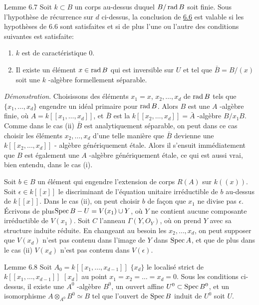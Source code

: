 \documentclass[10pt]{../fichiers-configuration-latex/smfart}
\begin{document}
\begin{enonce*}{Lemme 6.7}
Soit $k\subset B$ un corps au-dessus duquel $B/\operatorname{rad} B$ soit
finie. Sous l'hypothèse de récurrence sur $d$ ci-dessus, la conclusion
de \hyperref[XIX.lem6.6]{6.6} est valable si les hypothèses de $6.6$ sont satisfaites et si
de plus l'une ou l'autre des conditions suivantes est satisfaite:
\begin{enumerate}
\renewcommand{\theenumi}{\roman{enumi}}
\renewcommand{\labelenumi}{(\theenumi)}
\item $k$ est de caractéristique $0$.

\item Il existe un élément $x\in \operatorname{rad} B$ qui est inversible sur $U$ et
tel que $\bar{B}=B/(x)$ soit une $k$ -algèbre formellement séparable.
\end{enumerate}
\end{enonce*}

\medskip
\noindent
\emph{Démonstration}. Choisissons des éléments $x_{1}=x$,
$x_{2},\ldots, x_{d}$ de $\operatorname{rad} B$ tels que $\{x_{1},\ldots,x_{d}\}$
engendre un idéal primaire pour $\operatorname{rad} B$. Alors $B$ est une $A$
-algèbre finie, où $A=k[[x_{1},\ldots,x_{d}]]$, et $\bar{B}$ est la
$k[[x_{2},\ldots, x_{d}]]=\bar{A}$ -algèbre $B/x_{1}B$. Comme dans le
cas (ii) $\bar{B}$ est analytiquement séparable, on peut dans ce cas
choisir les éléments $x_{2},\ldots,x_{d}$ d'une telle manière que
$\bar{B}$ devienne une $k[[x_{2},\ldots,x_{d}]]$ - algèbre
génériquement étale. Alors il s'ensuit immédiatement que $B$ est
également une $A$ -algèbre génériquement étale, ce qui est aussi vrai,
bien entendu, dans le cas (i).

Soit $b\in B$ un élément qui engendre l'extension de corps $R(A)$ sur
$k((x))$. Soit $\epsilon \in k[[x]]$ le discriminant de l'équation
unitaire irréductible de $b$ au-dessus de $k[[x]]$. Dans le cas (ii),
on peut choisir $b$ de façon que $x_{1}$ ne divise pas
$\epsilon$. Écrivons de plus\pageoriginale $\operatorname{Spec} B-U=V(x_{1})\cup Y$,
où $Y$ ne contient aucune composante irréductible de $V(x_{1})$. Soit
$C$ l'anneau $\Gamma(Y,O_{Y})$, où on prend $Y$ avec sa structure
induite réduite. En changeant au besoin les $x_{2},\ldots,x_{d}$, on
peut supposer que $V(x_{d})$ n'est pas contenu dans l'image de $Y$
dans $\operatorname{Spec} A$, et que de plus dans le cas (ii) $V(x_{d})$ n'est pas
contenu dans $V(\epsilon)$.

\begin{enonce*}{Lemme 6.8}
Soit $A_{0}=k[[x_{1},\ldots,x_{d-1}]]$ $\{x_{d}\}$ le localisé strict
de $k[[x_{1},\ldots,x_{d-1}]]$ $[x_{d}]$ au point
$x_{1}=x_{2}=\ldots=x_{d}=0$. Sous les conditions ci-dessus, il existe
une $A^{0}$ -algèbre $B^{0}$, un ouvert affine $U^{0}\subset \operatorname{Spec}
B^{0}$, et un isomorphisme $A\otimes_{A^{0}}B^{0}\simeq B$ tel que
l'ouvert de $\operatorname{Spec} B$ induit de $U^{0}$ soit $U$.
\end{enonce*}
\end{document}
